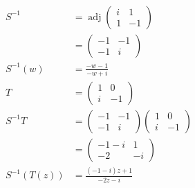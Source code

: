 \documentclass{article}
\newcommand{\adj}{\operatorname{adj}}
\begin{document}
\setcounter{subsubsection}{4}
\subsubsection{}

\begin{align*}
  S^{-1}        & = \adj \begin{pmatrix}
                           i & 1  \\
                           1 & -1
                         \end{pmatrix}             \\
                & = \begin{pmatrix}
                      -1 & -1 \\
                      -1 & i
                    \end{pmatrix}                  \\
  S^{-1}(w)     & = \frac{-w - 1}{-w + i}           \\
  T             & = \begin{pmatrix}
                      1 & 0  \\
                      i & -1
                    \end{pmatrix}                  \\
  S^{-1} T      & = \begin{pmatrix}
                      -1 & -1 \\
                      -1 & i
                    \end{pmatrix} \begin{pmatrix}
                                    1 & 0  \\
                                    i & -1
                                  \end{pmatrix}    \\
                & = \begin{pmatrix}
                      -1 - i & 1  \\
                      -2     & -i
                    \end{pmatrix}                  \\
  S^{-1} (T(z)) & = \frac{(-1 - i) z + 1}{-2 z - i}
\end{align*}

\setcounter{subsubsection}{6}
\subsubsection{}
\end{document}
